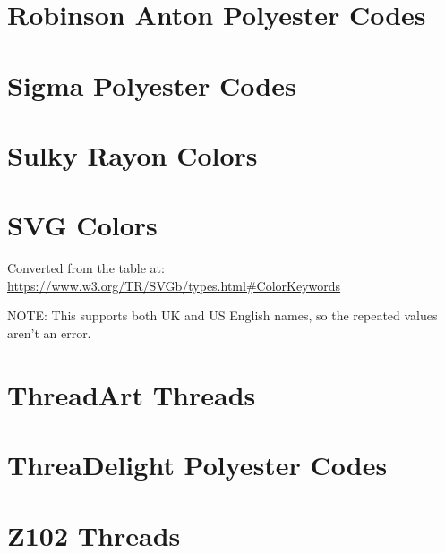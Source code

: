 \section{Robinson Anton Polyester Codes}

%

\section{Sigma Polyester Codes}

%

\section{Sulky Rayon Colors}

%

\section{SVG Colors}

Converted from the table at:
\url{https://www.w3.org/TR/SVGb/types.html#ColorKeywords}

NOTE: This supports both UK and US English names, so the repeated values aren't
an error.

\section{ThreadArt Threads}

%

%
\fi

\section{ThreaDelight Polyester Codes}

\section{Z102 Threads}

%



\printindex


